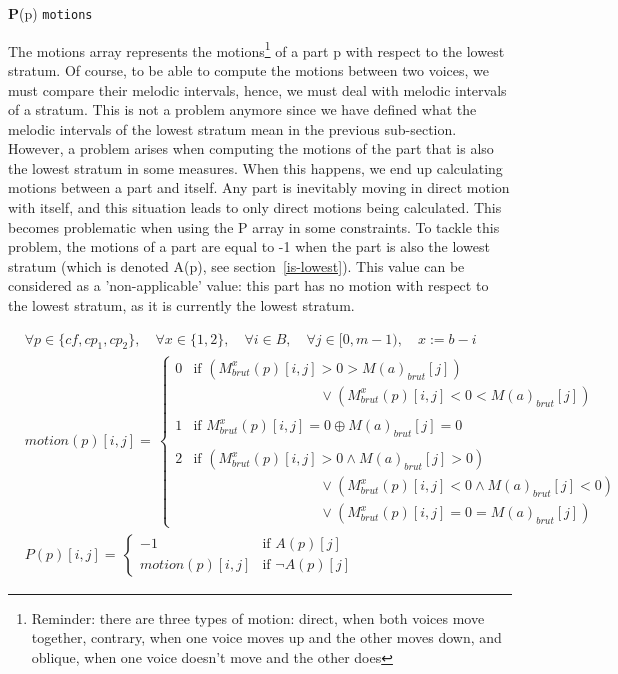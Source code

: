 \vspace{.5cm}
\noindent \textbf{P}(p) \hspace*{.2cm} \texttt{motions}

The motions array represents the motions\footnote{Reminder: there are three types of motion: direct, when both voices move together, contrary, when one voice moves up and the other moves down, and oblique, when one voice doesn't move and the other does} of a part p with respect to the lowest stratum. Of course, to be able to compute the motions between two voices, we must compare their melodic intervals, hence, we must deal with melodic intervals of a stratum. This is not a problem anymore since we have defined what the melodic intervals of the lowest stratum mean in the previous sub-section.
However, a problem arises when computing the motions of the part that is also the lowest stratum in some measures. When this happens, we end up calculating motions between a part and itself. Any part is inevitably moving in direct motion with itself, and this situation leads to only direct motions being calculated. This becomes problematic when using the P array in some constraints. To tackle this problem, the motions of a part are equal to -1 when the part is also the lowest stratum (which is denoted A(p), see section~\ref{is-lowest}). This value can be considered as a 'non-applicable' value: this part has no motion with respect to the lowest stratum, as it is currently the lowest stratum.

\begin{equation}
\begin{aligned}
&\forall p \in \{\mathit{cf}, cp_1, cp_2\}, \quad \forall x \in \{1, 2\}, \quad \forall i \in B, \quad \forall j \in [0, m - 1),\quad x := b - i\\
    &motion(p)[i,j] = \,  
    \begin{cases}
        0 &\text{if } (M_{brut}^{x}(p)[i, j] > 0 > M(a)_{brut}[j]) \\ & \quad \quad \quad \quad \quad \quad \quad \quad \quad  \vee (M_{brut}^{x}(p)[i, j] < 0 < M(a)_{brut}[j]) \\
        &\\
        1 &\text{if } M_{brut}^{x}(p)[i, j] = 0  \oplus M(a)_{brut}[j]=0 \\
        &\\
        2 &\text{if } (M_{brut}^{x}(p)[i, j] > 0 \land M(a)_{brut}[j] > 0) \\ & \quad \quad \quad \quad \quad \quad \quad \quad \quad   \vee  (M_{brut}^{x}(p)[i, j] < 0 \land M(a)_{brut}[j] <0)\\
        &\quad \quad \quad \quad \quad \quad \quad \quad \quad \vee (M_{brut}^{x}(p)[i, j] = 0 = M(a)_{brut}[j])
    \end{cases} 
    \\
    &P(p)[i,j] = \,  
    \begin{cases}
        -1 & \text{if } A(p)[j] \\
        motion(p)[i,j] & \text{if } \neg A(p)[j]
    \end{cases}
\end{aligned}
\label{eq:motions}
\end{equation}

